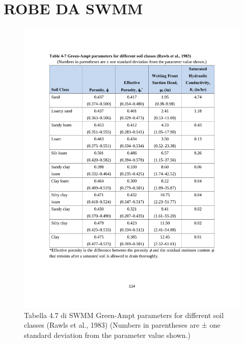 \appendix
\chapter{ROBE DA SWMM}
\label{appendix:SWMM}
%
\begin{figure}[htbp]
    \centering
    \includegraphics[trim=2.5cm 4.5cm 2.5cm 3.6cm,clip,width=\textwidth]{IMG/table4-7_Ks.pdf} 
    \caption[Tabella 4.7 di SWMM]{Tabella 4.7 di SWMM Green-Ampt parameters for different soil classes (Rawls et al., 1983) (Numbers in parentheses are ± one standard deviation from the parameter value shown.)}
    \label{SWMM:tabella4-7}
\end{figure}

